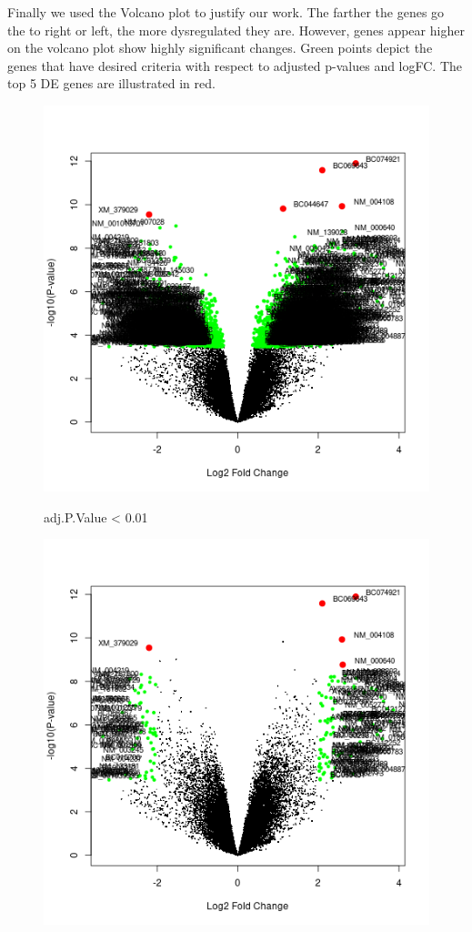 \documentclass[12pt, ]{article}
\begin{document}
Finally we used the Volcano plot to justify our work. The farther the genes go the to right or left, the more dysregulated they are. However, genes appear higher on the volcano plot show highly significant changes. Green points depict the genes that have desired criteria with respect to 
adjusted p-values and logFC. 
The top 5 DE genes are illustrated in red. 

\begin{figure}[!htbp]

\begin{minipage}{.48\textwidth}
\includegraphics[width=\textwidth]{VolcanoPlotadj.png}
\scriptsize\centerline{adj.P.Value < 0.01}
\end{minipage}\hfill
\begin{minipage}{.48\textwidth}
\includegraphics[width=\textwidth]{VolcanoPlotadjlogFC.png}

\end{minipage}
\end{figure}
\end{document}
